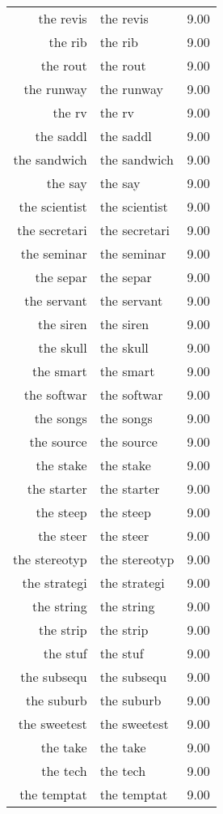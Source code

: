 \begin{table}[ht]
\begin{tabular}{rlr}
  the revis & the revis & 9.00 \\ 
  the rib & the rib & 9.00 \\ 
  the rout & the rout & 9.00 \\ 
  the runway & the runway & 9.00 \\ 
  the rv & the rv & 9.00 \\ 
  the saddl & the saddl & 9.00 \\ 
  the sandwich & the sandwich & 9.00 \\ 
  the say & the say & 9.00 \\ 
  the scientist & the scientist & 9.00 \\ 
  the secretari & the secretari & 9.00 \\ 
  the seminar & the seminar & 9.00 \\ 
  the separ & the separ & 9.00 \\ 
  the servant & the servant & 9.00 \\ 
  the siren & the siren & 9.00 \\ 
  the skull & the skull & 9.00 \\ 
  the smart & the smart & 9.00 \\ 
  the softwar & the softwar & 9.00 \\ 
  the songs & the songs & 9.00 \\ 
  the source & the source & 9.00 \\ 
  the stake & the stake & 9.00 \\ 
  the starter & the starter & 9.00 \\ 
  the steep & the steep & 9.00 \\ 
  the steer & the steer & 9.00 \\ 
  the stereotyp & the stereotyp & 9.00 \\ 
  the strategi & the strategi & 9.00 \\ 
  the string & the string & 9.00 \\ 
  the strip & the strip & 9.00 \\ 
  the stuf & the stuf & 9.00 \\ 
  the subsequ & the subsequ & 9.00 \\ 
  the suburb & the suburb & 9.00 \\ 
  the sweetest & the sweetest & 9.00 \\ 
  the take & the take & 9.00 \\ 
  the tech & the tech & 9.00 \\ 
  the temptat & the temptat & 9.00 \\ 

\end{tabular}
\end{table}
